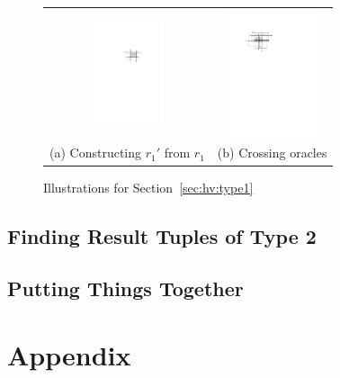 \documentclass[sigconf]{acmart}
\def\vgap{\vspace{1mm}}
\def\figcapup{\vspace{-0mm}}
\def\figcapdown{\vspace{-0mm}}
\begin{document}
\vgap 

\begin{figure} 
    \begin{tabular}{cc}
            \hspace{-3mm}
            \includegraphics[height=30mm]{./artwork/four-segs} &
            \hspace{-5mm}
            \includegraphics[height=37mm]{./artwork/oracle} \\ 
            \hspace{-3mm} (a) Constructing $r_1'$ from $r_1$ & 
            \hspace{-5mm} (b) Crossing oracles
    \end{tabular}
    \figcapup
    \caption{Illustrations for Section~\ref{sec:hv:type1}}
    \label{fig:type1}
    \figcapdown
\end{figure}



\subsection{Finding Result Tuples of Type 2} \label{sec:hv:type2}

\subsection{Putting Things Together} \label{sec:hv:analysis}




\balance

\appendix 

\section*{Appendix}
\end{document}
